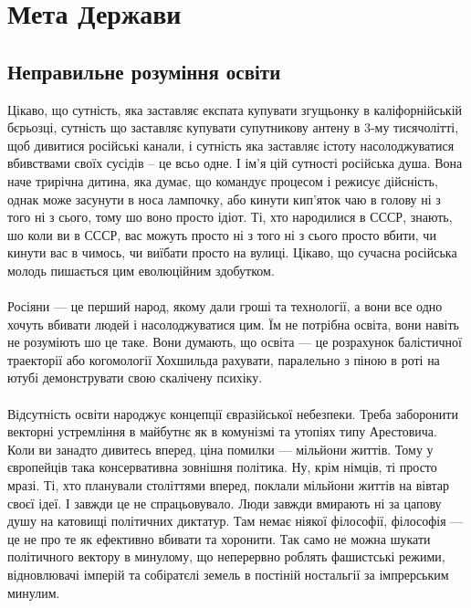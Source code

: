 \section{Мета Держави}

\subsection{Неправильне розуміння освіти}

Цікаво, що сутність, яка заставляє експата купувати згущьонку в каліфорнійській бєрьозці,
сутність що заставляє купувати супутникову антену в 3-му тисячолітті, щоб дивитися
російські канали, і сутність яка заставляє істоту насолоджуватися вбивствами своїх
сусідів -- це всьо одне. І ім'я цій сутності російська душа. Вона наче трирічна
дитина, яка думає, що командує процесом і режисує дійсність, однак може засунути
в носа лампочку, або кинути кип'яток чаю в голову ні з того ні з сього, тому шо
воно просто ідіот. Ті, хто народилися в СССР, знають, шо коли ви в СССР, вас можуть
просто ні з того ні з сього просто вбити, чи кинути вас в чимось, чи виїбати
просто на вулиці. Цікаво, що сучасна російська молодь пишається цим еволюційним здобутком.
\\
\\
Росіяни --- це перший народ, якому дали гроші та технології, а вони все одно хочуть
вбивати людей і насолоджуватися цим. Їм не потрібна освіта, вони навіть не
розуміють шо це таке. Вони думають, що освіта --- це розрахунок балістичної траекторії
або когомології Хохшильда рахувати, паралельно з піною в роті на ютубі демонструвати
свою скалічену психіку.
\\
\\
Відсутність освіти народжує концепції євразійської небезпеки. Треба заборонити
векторні устремління в майбутнє як в комунізмі та утопіях типу Арестовича.
Коли ви занадто дивитесь вперед, ціна помилки --- мільйони життів. Тому у європейців
така консервативна зовнішня політика. Ну, крім німців, ті просто мразі.
Ті, хто планували століттями вперед, поклали мільйони життів на вівтар своєї ідеї.
І завжди це не спрацьовувало. Люди завжди вмирають ні за цапову душу на катовищі
політичних диктатур. Там немає ніякої філософії, філософія --- це не про те як
ефективно вбивати та хоронити.
Так само не можна шукати політичного вектору в минулому, що неперервно роблять
фашистські режими, відновлювачі імперій та собіратєлі земель в постіній ностальгії
за імпрерським минулим.
\\
\\
